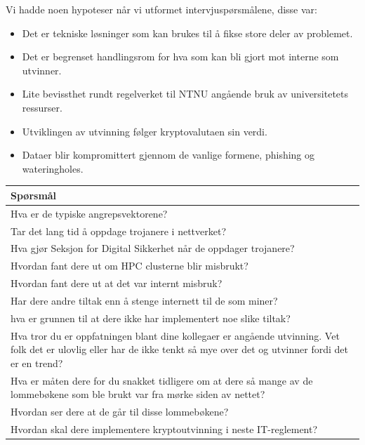 Vi hadde noen hypoteser når vi utformet intervjuspørsmålene, disse var:
\begin{itemize}
    \item Det er tekniske løsninger som kan brukes til å fikse store deler av problemet.
    \item Det er begrenset handlingsrom for hva som kan bli gjort mot interne som utvinner.
    \item Lite bevissthet rundt regelverket til NTNU angående bruk av universitetets ressurser.
    \item Utviklingen av utvinning følger kryptovalutaen sin verdi.
    \item Dataer blir kompromittert gjennom de vanlige formene, phishing og wateringholes.
\end{itemize}

\begin{table}[H]
    \centering
    \begin{tabular}{|m{30em}|} 
        \hline
             \cellcolor{yellow} Spørsmål  \\
        \hline
          Hva er de typiske angrepsvektorene?  \\
         \hline
         Tar det lang tid å oppdage trojanere i nettverket? \\ 
         \hline
         Hva gjør Seksjon for Digital Sikkerhet når de oppdager trojanere? \\
         \hline
         Hvordan fant dere ut om HPC clusterne blir misbrukt? \\
         \hline
         Hvordan fant dere ut at det var internt misbruk?\\
         \hline
         Har dere andre tiltak enn å stenge internett til de som miner? \\
         \hline
         hva er grunnen til at dere ikke har implementert noe slike tiltak? \\
         \hline
         Hva tror du er oppfatningen blant dine kollegaer er angående utvinning. Vet folk det er ulovlig eller har de ikke tenkt så mye over det og utvinner fordi det er en trend? \\
         \hline
         Hva er måten dere for du snakket tidligere om at dere så mange av de lommebøkene som ble brukt var fra mørke siden av nettet?  \\
         \hline
         Hvordan ser dere at de går til disse lommebøkene? \\
         \hline
          Hvordan skal dere implementere kryptoutvinning i neste IT-reglement? \\

\end{tabular}
\end{table}
